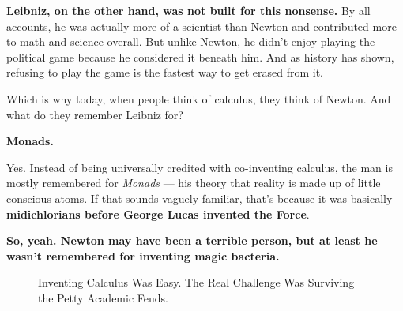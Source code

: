 \textbf{Leibniz, on the other hand, was not built for this nonsense.} By all accounts, he was actually more of a scientist than Newton and contributed more to math and science overall. But unlike Newton, he didn’t enjoy playing the political game because he considered it beneath him. And as history has shown, refusing to play the game is the fastest way to get erased from it. 

Which is why today, when people think of calculus, they think of Newton. And what do they remember Leibniz for? 

\textbf{Monads.}  

Yes. Instead of being universally credited with co-inventing calculus, the man is mostly remembered for \textit{Monads} --- his theory that reality is made up of little conscious atoms. If that sounds vaguely familiar, that’s because it was basically \textbf{midichlorians before George Lucas invented the Force}. 

\textbf{So, yeah. Newton may have been a terrible person, but at least he wasn’t remembered for inventing magic bacteria.}





\begin{figure}[H]
\centering
{}
\caption{Inventing Calculus Was Easy. The Real Challenge Was Surviving the Petty Academic Feuds.}
\end{figure}












